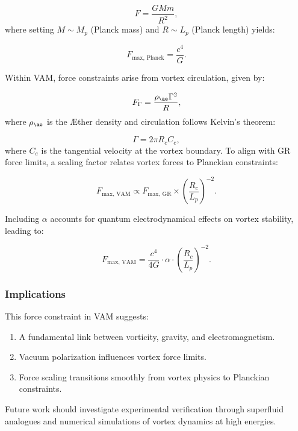 \documentclass[aps,preprint,superscriptaddress]{revtex4-2}
\begin{document}
\begin{equation*}
F = \frac{GMm}{R^2},
\end{equation*}
where setting $M \sim M_p$ (Planck mass) and $R \sim L_p$ (Planck length) yields:


\begin{equation*}
F_{\text{max, Planck}} = \frac{c^4}{G}.
\end{equation*}


Within VAM, force constraints arise from vortex circulation, given by:


\begin{equation*}
F_{\Gamma} = \frac{\rho_{\ae} \Gamma^2}{R},
\end{equation*}
where $\rho_{\ae}$ is the \AE ther density and circulation follows Kelvin’s theorem:


\begin{equation*}
\Gamma = 2\pi R_c C_e,
\end{equation*}
where $C_e$ is the tangential velocity at the vortex boundary. To align with GR force limits, a scaling factor relates vortex forces to Planckian constraints:


\begin{equation*}
F_{\text{max, VAM}} \propto F_{\text{max, GR}} \times \left(\frac{R_c}{L_p}\right)^{-2}.
\end{equation*}


Including $\alpha$ accounts for quantum electrodynamical effects on vortex stability, leading to:


\begin{equation*}
F_{\text{max, VAM}} = \frac{c^4}{4G} \cdot \alpha \cdot \left(\frac{R_c}{L_p}\right)^{-2}.
\end{equation*}


\subsubsection*{Implications}
This force constraint in VAM suggests:
\begin{enumerate}
\item A fundamental link between vorticity, gravity, and electromagnetism.
\item Vacuum polarization influences vortex force limits.
\item Force scaling transitions smoothly from vortex physics to Planckian constraints.
\end{enumerate}


Future work should investigate experimental verification through superfluid analogues and numerical simulations of vortex dynamics at high energies.
\end{document}

